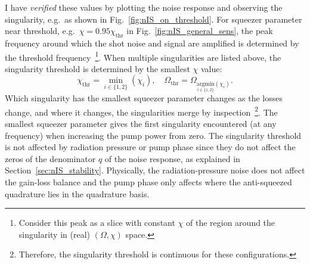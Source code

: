 I have \emph{verified} these values by plotting the noise response and observing the singularity, e.g.\ as shown in Fig.~\ref{fig:nIS_on_threshold}. For squeezer parameter near threshold, e.g.\ $\chi=0.95\chi_\text{thr}$ in Fig.~\ref{fig:nIS_general_sens}, the peak frequency around which the shot noise and signal are amplified is determined by the threshold frequency~\footnote{Consider this peak as a slice with constant $\chi$ of the region around the singularity in (real) $(\Omega,\chi)$ space.}. When multiple singularities are listed above, the singularity threshold is determined by the smallest $\chi$ value:
\begin{equation}
\chi_\text{thr}=\min_{i\in\{1,2\}}(\chi_i),\quad\Omega_\text{thr}=\Omega_{\underset{i\in\{1,2\}}{\text{argmin}}(\chi_i)}.
\end{equation}
Which singularity has the smallest squeezer parameter changes as the losses change, and where it changes, the singularities merge by inspection~\footnote{Therefore, the singularity threshold is continuous for these configurations.}. The smallest squeezer parameter gives the first singularity encountered (at any frequency) when increasing the pump power from zero. %
The singularity threshold is not affected by radiation pressure or pump phase since they do not affect the zeros of the denominator $q$ of the noise response, as explained in Section~\ref{sec:nIS_stability}. Physically, the radiation-pressure noise does not affect the gain-loss balance and the pump phase only affects where the anti-squeezed quadrature lies in the quadrature basis.

